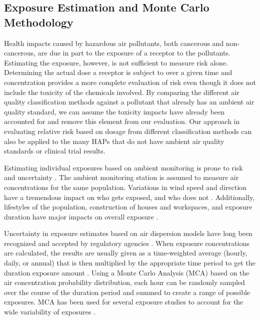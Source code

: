 \subsection{Exposure Estimation and Monte Carlo Methodology}

Health impacts caused by hazardous air pollutants, both cancerous and non-cancerous, are due in part to the exposure of a receptor to the pollutants. Estimating the exposure, however, is not sufficient to measure risk alone. Determining the actual dose a receptor is subject to over a given time and concentration provides a more complete evaluation of risk even though it does not include the toxicity of the chemicals involved. By comparing the different air quality classification methods against a pollutant that already has an ambient air quality standard, we can assume the toxicity impacts have already been accounted for and remove this element from our evaluation. Our approach in evaluating relative risk based on dosage from different classification methods can also be applied to the many HAPs that do not have ambient air quality standards or clinical trial results.

Estimating individual exposures based on ambient monitoring is prone to risk and uncertainty \citep{Pernigotti2013, Thunis2013}.  The ambient monitoring station is assumed to measure air concentrations for the same population.  Variations in wind speed and direction have a tremendous impact on who gets exposed, and who does not \citep{Pratt2012}. Additionally, lifestyles of the population, construction of houses and workspaces, and exposure duration have major impacts on overall exposure \citep{Bell2006}.

Uncertainty in exposure estimates based on air dispersion models have long been recognized and accepted by regulatory agencies \citep{Colvile2002, Fox1984}.  When exposure concentrations are calculated, the results are usually given as a time-weighted average (hourly, daily, or annual) that is then multiplied by the appropriate time period to get the duration exposure amount \citep{Zhang2013}. Using a Monte Carlo Analysis (MCA) based on the air concentration probability distribution, each hour can be randomly sampled over the course of the duration period and summed to create a range of possible exposures.  MCA has been used for several exposure studies to account for the wide variability of exposures \citep{Gerharz2013, Tan2014}.

